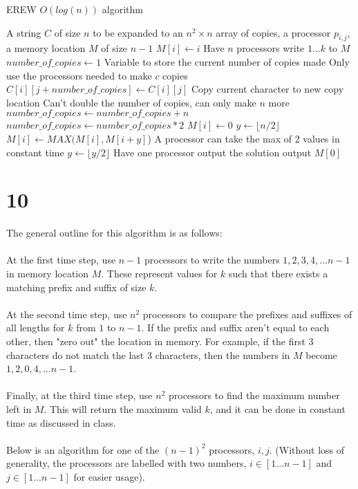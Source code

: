 \documentclass[letterpaper,notitlepage,twoside]{article}
\begin{document}
\begin{algorithm}
    \begin{algorithmic}%
       \caption{EREW $O(log(n))$ algorithm}
        \Require A string $C$ of size $n$ to be expanded to an $n^2\times n$ array of copies, a processor $p_{i, j}$, a memory location $M$ of size $n - 1$
        	\State $M[i] \gets i$ \Comment Have $n$ processors write $1...k$ to $M$ 
        \EndIf
        \State $number\_of\_copies \gets 1$ \Comment Variable to store the current number of copies made
         \Comment Only use the processors needed to make $c$ copies
        \State $C[i][j+number\_of\_copies] \gets C[i][j]$ \Comment Copy current character to new copy location
        \EndIf
         \Comment Can't double the number of copies, can only make $n$ more
        \State $number\_of\_copies \gets number\_of\_copies + n$
        \Else
        \State $number\_of\_copies \gets number\_of\_copies * 2$
        \EndIf
        \EndWhile
            \State $M[i] \gets 0$ 
        \EndIf
        \State $y \gets \lfloor{n/2}\rfloor$ 
        \State $M[i] \gets MAX(M[i], M[i+y]$) \Comment A processor can take the max of 2 values in constant time
        \State $y \gets \lfloor{y/2}\rfloor$
        \EndWhile
         \Comment Have one processor output the solution 
        \State output $M[0]$
        \EndIf
    \end{algorithmic}
\end{algorithm}
\section*{10}
The general outline for this algorithm is as follows:
\\\\
At the first time step, use $n - 1$ processors to write the numbers $1, 2, 3, 4, ... n - 1$ in memory location $M$. These represent values for $k$ such that there exists a matching prefix and suffix of size $k$.
\\\\
At the second time step, use $n^2$ processors to compare the prefixes and suffixes of all lengths for $k$ from $1$ to $n - 1$. If the prefix and suffix aren't equal to each other, then "zero out" the location in memory. For example, if the first 3 characters do not match the last 3 characters, then the numbers in $M$ become $1, 2, 0, 4, ... n -1$.
\\\\
Finally, at the third time step, use $n^2$ processors to find the maximum number left in $M$. This will return the maximum valid $k$, and it can be done in constant time as discussed in class.
\\\\
Below is an algorithm for one of the $(n - 1)^2$ processors, $i, j$. (Without loss of generality, the processors are labelled with two numbers, $i \in [1...n-1]$ and $j \in [1...n-1]$ for easier usage).
\end{document}
